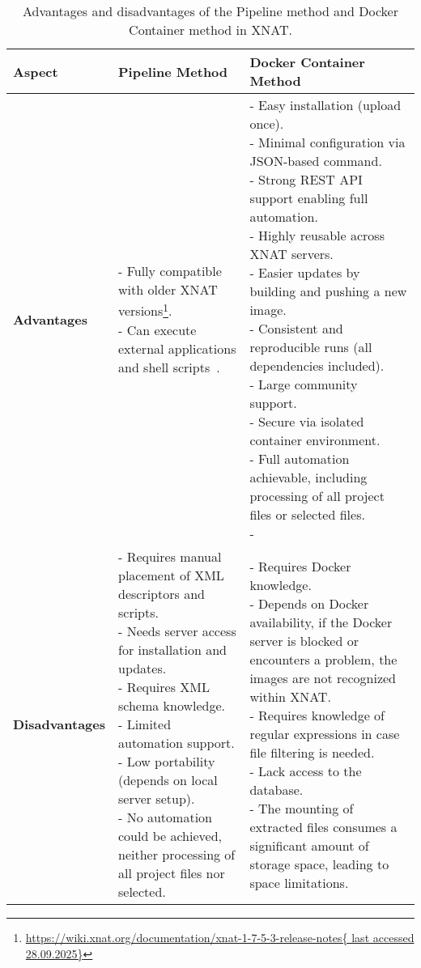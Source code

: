 \begin{table}[htbp]
\centering
\caption{Advantages and disadvantages of the Pipeline method and Docker Container method in XNAT.}
\renewcommand{\arraystretch}{1.3}
\begin{tabular}{|p{3cm}|p{6cm}|p{6cm}|}
\hline
\textbf{Aspect} & \textbf{Pipeline Method} & \textbf{Docker Container Method} \\
\hline
\textbf{Advantages} &
\parbox[t]{6cm}{
- Fully compatible with older XNAT versions\footnote{\url{https://wiki.xnat.org/documentation/xnat-1-7-5-3-release-notes{ last accessed 28.09.2025}}}.\\
- Can execute external applications and shell scripts~\cite{jansen_extending_2015}.
}
&
\parbox[t]{6cm}{
- Easy installation (upload once). \\
- Minimal configuration via JSON-based command. \\
- Strong REST API support enabling full automation. \\
- Highly reusable across XNAT servers. \\
- Easier updates by building and pushing a new image. \\
- Consistent and reproducible runs (all dependencies included). \\
- Large community support. \\
- Secure via isolated container environment. \\
- Full automation achievable, including processing of all
project files or selected files.\\
- 
} \\
\hline
\textbf{Disadvantages} &
\parbox[t]{6cm}{
- Requires manual placement of XML descriptors and scripts. \\
- Needs server access for installation and updates. \\
- Requires XML schema knowledge. \\
- Limited automation support. \\
- Low portability (depends on local server setup).\\
- No automation could be achieved, neither processing of all project files nor selected.\\
}
&
\parbox[t]{6cm}{
- Requires Docker knowledge. \\
- Depends on Docker availability, if the Docker server is blocked or encounters a problem, the images are not recognized within XNAT. \\
- Requires knowledge of regular expressions in case file filtering is needed.\\
- Lack access to the database. \\
- The mounting of extracted files consumes a significant amount of storage space, leading to space limitations.\\
} \\
\hline
\end{tabular}
\label{tab:docker_pipeline}
\end{table}



